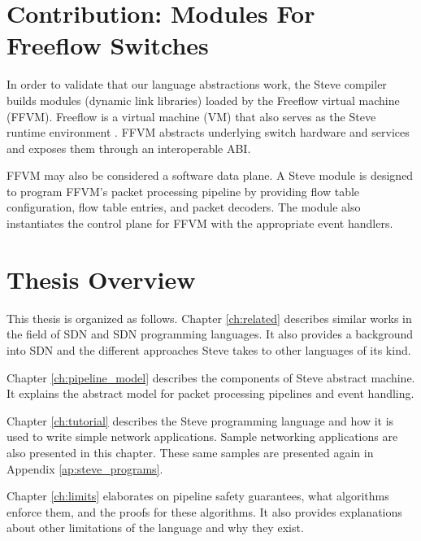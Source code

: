 
\section{Contribution: Modules For Freeflow Switches}

In order to validate that our language abstractions work, the Steve compiler builds modules (dynamic link libraries)
loaded by the Freeflow virtual machine (FFVM). 
Freeflow is a virtual machine (VM) that also serves as the Steve runtime
environment \cite{freeflow_software}.
FFVM abstracts underlying switch
hardware and services and exposes them through an interoperable ABI.

FFVM may also be considered a software data plane.
A Steve module is designed to program FFVM's packet processing pipeline by providing
flow table configuration, flow table entries, and packet decoders.
The module also instantiates the control plane for FFVM with the appropriate
event handlers.

\section{Thesis Overview}

This thesis is organized as follows. Chapter \ref{ch:related} describes similar
works in the field of SDN and SDN programming languages. It also provides a
background into SDN and the different approaches Steve takes to other languages
of its kind.

Chapter \ref{ch:pipeline_model} describes the components of Steve abstract machine. It explains the abstract model for packet processing pipelines and event handling.

Chapter \ref{ch:tutorial} describes the Steve programming language and how it is used to write simple network applications.
Sample networking applications are also presented in
this chapter. These same samples are presented again in Appendix
\ref{ap:steve_programs}.

Chapter \ref{ch:limits} elaborates on pipeline safety guarantees, what algorithms enforce them, and the proofs for these algorithms. It also provides explanations about other 
limitations of the language and why they exist.

